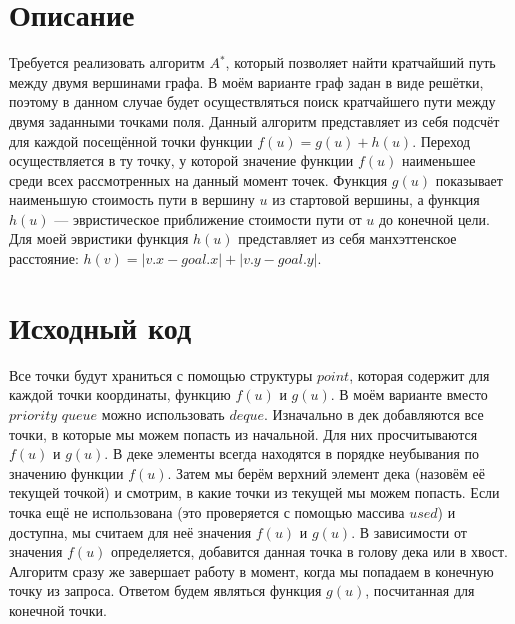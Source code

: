 \section{Описание}
Требуется реализовать алгоритм $A$$^*$, который позволяет найти кратчайший путь между двумя вершинами графа. В моём варианте граф задан в виде решётки, поэтому в данном случае будет осуществляться поиск кратчайшего пути между двумя заданными точками поля. Данный алгоритм представляет из себя подсчёт для каждой посещённой точки функции $f(u) = g(u) + h(u)$. Переход осуществляется в ту точку, у которой значение функции $f(u)$ наименьшее среди всех рассмотренных на данный момент точек. Функция $g(u)$ показывает наименьшую стоимость пути в вершину $u$ из стартовой вершины, а функция $h(u)$ — эвристическое приближение стоимости пути от $u$ до конечной цели. Для моей эвристики функция $h(u)$ представляет из себя манхэттенское расстояние: $h(v)=|v.x−goal.x|+|v.y−goal.y|$.

\pagebreak

\section{Исходный код}
Все точки будут храниться с помощью структуры $point$, которая содержит для каждой точки координаты, функцию $f(u)$ и $g(u)$. В моём варианте вместо $priority$ $queue$ можно использовать $deque$. Изначально в дек добавляются все точки, в которые мы можем попасть из начальной. Для них просчитываются $f(u)$ и $g(u)$. В деке элементы всегда находятся в порядке неубывания 
по значению функции $f(u)$. Затем мы берём верхний элемент дека (назовём её текущей точкой) и смотрим, в какие точки из текущей мы можем попасть. Если точка ещё не использована (это проверяется с помощью массива $used$) и доступна, мы считаем для неё значения $f(u)$ и $g(u)$. В зависимости от значения $f(u)$ определяется, добавится данная точка в голову дека или в хвост. Алгоритм сразу же завершает работу в момент, когда мы попадаем в конечную точку из запроса. Ответом будем являться функция $g(u)$, посчитанная для конечной точки.

